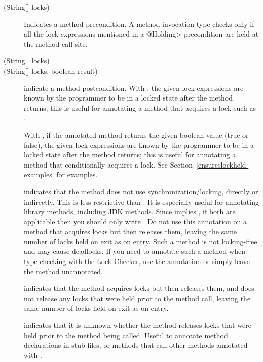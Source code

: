 \begin{description}
\item[\small{(String[] locks)}]
  Indicates a method precondition.  A method invocation type-checks only if all the lock expressions
  mentioned in a \<@Holding> precondition are held at the method call site.
\item[\small{(String[] locks)}]
\item[\small{(String[] locks, boolean result)}]
  indicate a method postcondition.  With , the given lock
  expressions are known by the programmer to be in
  a locked state after the method returns; this is useful for annotating a
  method that acquires a lock such as
  .

  With , if the annotated method returns the given
  boolean value (true or false), the given lock
  expressions are known by the programmer to be in
  a locked state after the method returns; this is useful for annotating a
  method that conditionally acquires a lock.
  See Section~\ref{ensureslockheld-examples} for examples.

\item[]
  indicates that the method does not use synchronization/locking,
  directly or indirectly.  This is less restrictive than
  .  It is especially useful for
  annotating library methods, including JDK methods.  Since
   implies , if both are applicable
  then you should only write .
  Do not use this annotation on a method that acquires locks but then releases
  them, leaving the same number of locks held on exit as on entry.  Such a
  method is not locking-free and may cause deadlocks.  If you need to annotate
  such a method when type-checking with the Lock Checker, use the 
  annotation or simply leave the method unannotated.

\item[]
  indicates that the method acquires locks but then releases
  them, and does not release any locks that were held prior to the method call,
  leaving the same number of locks held on exit as on entry.

\item[]
  indicates that it is unknown whether the method releases
  locks that were held prior to the method being called.
  Useful to annotate method declarations in stub files,
  or methods that call other methods annotated with .

\end{description}


